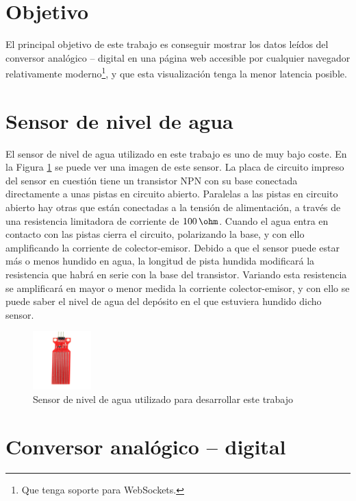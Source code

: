 \documentclass[conference,compsoc]{IEEEtran}
\begin{document}
	\section{Objetivo}

		El principal objetivo de este trabajo es conseguir mostrar los datos le\'idos del conversor
		anal\'ogico -- digital en una p\'agina web accesible por cualquier navegador relativamente
		moderno\footnote{Que tenga soporte para WebSockets.}, y que esta visualizaci\'on tenga la
		menor latencia posible.

	\section{Sensor de nivel de agua}

		El sensor de nivel de agua utilizado en este trabajo es uno de muy bajo coste. En la Figura
		\ref{fig:sensor} se puede ver una imagen de este sensor. La placa de circuito impreso del sensor
		en cuesti\'on tiene un transistor NPN con su base conectada directamente a unas pistas en
		circuito abierto. Paralelas a las pistas en circuito abierto hay otras que est\'an conectadas a
		la tensi\'on de alimentaci\'on, a trav\'es de una resistencia limitadora de corriente de
		$100\,\ohm$. Cuando el agua entra en contacto con las pistas cierra el circuito, polarizando la
		base, y con ello amplificando la corriente de colector-emisor. Debido a que el sensor puede
		estar m\'as o menos hundido en agua, la longitud de pista hundida modificar\'a la resistencia
		que habr\'a en serie con la base del transistor. Variando esta resistencia se amplificar\'a en
		mayor o menor medida la corriente colector-emisor, y con ello se puede saber el nivel de agua
		del dep\'osito en el que estuviera hundido dicho sensor.

		\begin{figure}[h!]
			\centering
			\includegraphics[width=0.2\textwidth]{./figuras/sensor.jpg}
			\caption{Sensor de nivel de agua utilizado para desarrollar este trabajo}
			\label{fig:sensor}
		\end{figure}

	\section{Conversor anal\'ogico -- digital}
\end{document}
